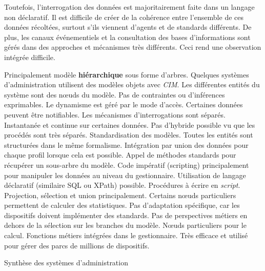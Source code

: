 Toutefois, l'interrogation des données est majoritairement faite dans un langage non déclaratif. Il est difficile de créer de la cohérence entre l'ensemble de ces données récoltées, surtout s'ils viennent d'agents et de standards différents. De plus, les canaux événementiels et la consultation des bases d'informations sont gérés dans des approches et mécanismes très différents. Ceci rend une observation intégrée difficile.

\begin{table}[!ht]
\criteretabDonnee
    {Principalement modèle \textbf{hiérarchique} sous forme d'arbres. Quelques systèmes d'administration utilisent des modèles objets avec \textit{CIM}.}
    {Les différentes entités du système sont des nœuds du modèle. Pas de contraintes ou d'inférences exprimables.}
    {Le dynamisme est géré par le mode d'accès. Certaines données peuvent être notifiables. Les mécanismes d'interrogations sont séparés.}
\criteretabTraitement
    {Instantanée et continue sur certaines données. Pas d'hybride possible vu que les procédés sont très séparés.}
    {Standardisation des modèles. Toutes les entités sont structurées dans le même formalisme. Intégration par union des données pour chaque profil lorsque cela est possible.}
    {Appel de méthodes standards pour récupérer un sous-arbre du modèle. Code impératif (scripting) principalement pour manipuler les données au niveau du gestionnaire. Utilisation de langage déclaratif (similaire SQL ou XPath) possible.}
    {Procédures à écrire en \textit{script}. Projection, sélection et union principalement. Certains nœuds particuliers permettent de calculer des statistiques.}
\criteretabAdaptabilite
    {Pas d'adaptation spécifique, car les dispositifs doivent implémenter des standards.}
    {Pas de perspectives métiers en dehors de la sélection sur les branches du modèle.}
    {Nœuds particuliers pour le calcul. Fonctions métiers intégrées dans le gestionnaire.}
    {Très efficace et utilisé pour gérer des parcs de millions de dispositifs.}
\caption{Synthèse des systèmes d'administration}\label{tab:rw:supervision:administration:synthese}
\end{table}
